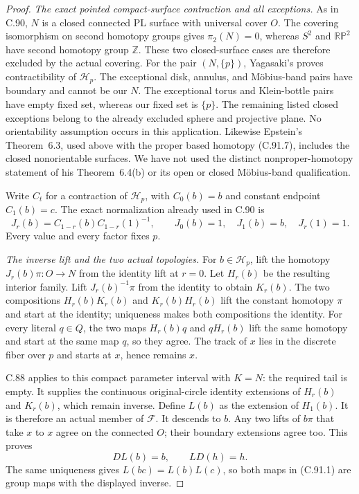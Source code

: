 \begin{proof}
\emph{The exact pointed compact-surface contraction and all exceptions.}
As in C.90, $N$ is a closed connected PL surface with
universal cover $O$.  The covering isomorphism on second
homotopy groups gives $\pi_2(N)=0$, whereas $S^2$ and
$\mathbb{RP}^2$ have second homotopy group $\mathbb Z$.
These two closed-surface cases are therefore excluded
by the actual covering.
For the pair $(N,\{p\})$, Yagasaki's
\cite[Lemma~2.1(i), p.~2; proof, p.~3]{C_Yagasaki2000}
proves contractibility of $\mathscr H_p$.
The exceptional disk, annulus, and M\"obius-band pairs
have boundary and cannot be our $N$.
The exceptional torus and Klein-bottle pairs have empty
fixed set, whereas our fixed set is $\{p\}$.
The remaining listed closed exceptions belong to the
already excluded sphere and projective plane.
No orientability assumption occurs in this application.
Likewise Epstein's Theorem~6.3, used above with the
proper based homotopy (C.91.7), includes the closed
nonorientable surfaces.  We have not used the distinct
nonproper-homotopy statement of his Theorem~6.4(b)
or its open or closed M\"obius-band qualification.

Write $C_t$ for a contraction of $\mathscr H_p$,
with $C_0(b)=b$ and constant endpoint $C_1(b)=c$.
The exact normalization already used in C.90 is
\[
 J_r(b)=C_{1-r}(b)C_{1-r}(1)^{-1},
 \qquad J_0(b)=1,\quad J_1(b)=b,\quad J_r(1)=1.                \tag{C.91.8}
\]
Every value and every factor fixes $p$.

\emph{The inverse lift and the two actual topologies.}
For $b\in\mathscr H_p$, lift the homotopy
$J_r(b)\pi:O\to N$ from the identity lift at $r=0$.
Let $H_r(b)$ be the resulting interior family.
Lift $J_r(b)^{-1}\pi$ from the identity to obtain $K_r(b)$.
The two compositions $H_r(b)K_r(b)$ and $K_r(b)H_r(b)$
lift the constant homotopy $\pi$ and start at the identity;
uniqueness makes both compositions the identity.
For every literal $q\in Q$, the two maps
$H_r(b)q$ and $qH_r(b)$ lift the same homotopy and
start at the same map $q$, so they agree.
The track of $x$ lies in the discrete fiber over $p$
and starts at $x$, hence remains $x$.

C.88 applies to this compact parameter interval with
$K=N$: the required tail is empty.
It supplies the continuous original-circle identity
extensions of $H_r(b)$ and $K_r(b)$, which remain inverse.
Define $L(b)$ as the extension of $H_1(b)$.
It is therefore an actual member of $\mathscr F$.
It descends to $b$.  Any two lifts of $b\pi$ that take
$x$ to $x$ agree on the connected $O$; their boundary
extensions agree too.  This proves
\[
              D L(b)=b,\qquad L D(h)=h.                       \tag{C.91.9}
\]
The same uniqueness gives $L(bc)=L(b)L(c)$, so both maps
in (C.91.1) are group maps with the displayed inverse.


\end{proof}
